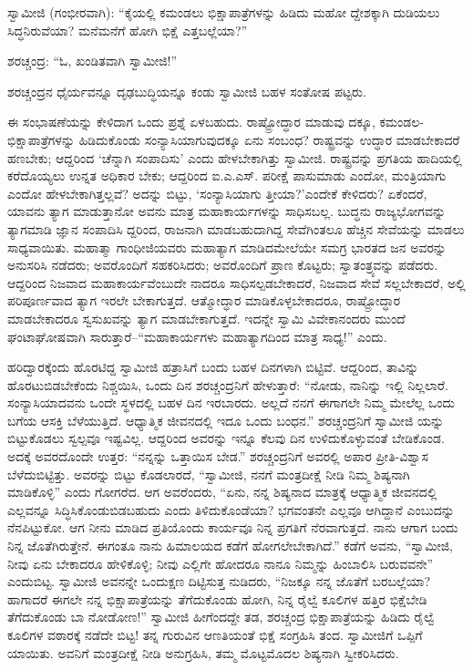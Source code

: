 ಸ್ವಾಮೀಜಿ (ಗಂಭೀರವಾಗಿ): “ಕೈಯಲ್ಲಿ ಕಮಂಡಲು ಭಿಕ್ಷಾಪಾತ್ರೆಗಳನ್ನು ಹಿಡಿದು ಮಹೋ ದ್ದೇಶಕ್ಕಾಗಿ ದುಡಿಯಲು ಸಿದ್ಧನಿರುವೆಯಾ? ಮನೆಮನೆಗೆ ಹೋಗಿ ಭಿಕ್ಷೆ ಎತ್ತಬಲ್ಲೆಯಾ?”

ಶರಚ್ಚಂದ್ರ: “ಓ, ಖಂಡಿತವಾಗಿ ಸ್ವಾಮೀಜಿ!”

ಶರಚ್ಚಂದ್ರನ ಧೈರ್ಯವನ್ನೂ ದೃಢಬುದ್ಧಿಯನ್ನೂ ಕಂಡು ಸ್ವಾಮೀಜಿ ಬಹಳ ಸಂತೋಷ ಪಟ್ಟರು.

ಈ ಸಂಭಾಷಣೆಯನ್ನು ಕೇಳಿದಾಗ ಒಂದು ಪ್ರಶ್ನೆ ಏಳಬಹುದು. ರಾಷ್ಟ್ರೋದ್ಧಾರ ಮಾಡುವು ದಕ್ಕೂ, ಕಮಂಡಲ-ಭಿಕ್ಷಾಪಾತ್ರೆಗಳನ್ನು ಹಿಡಿದುಕೊಂಡು ಸಂನ್ಯಾಸಿಯಾಗುವುದಕ್ಕೂ ಏನು ಸಂಬಂಧ? ರಾಷ್ಟ್ರವನ್ನು ಉದ್ಧಾರ ಮಾಡಬೇಕಾದರೆ ಹಣಬೇಕು; ಆದ್ದರಿಂದ ‘ಚೆನ್ನಾಗಿ ಸಂಪಾದಿಸು’ ಎಂದು ಹೇಳಬೇಕಾಗಿತ್ತು ಸ್ವಾಮೀಜಿ. ರಾಷ್ಟ್ರವನ್ನು ಪ್ರಗತಿಯ ಹಾದಿಯಲ್ಲಿ ಕರೆದೊಯ್ಯಲು ಉನ್ನತ ಅಧಿಕಾರ ಬೇಕು; ಆದ್ದರಿಂದ ಐ.ಎ.ಎಸ್. ಪರೀಕ್ಷೆ ಪಾಸುಮಾಡು ಎಂದೋ, ಮಂತ್ರಿಯಾಗು ಎಂದೋ ಹೇಳಬೇಕಾಗಿತ್ತಲ್ಲವೆ? ಅದನ್ನು ಬಿಟ್ಟು, ‘ಸಂನ್ಯಾಸಿಯಾಗು ತ್ತೀಯಾ?’ಎಂದೇಕೆ ಕೇಳಿದರು? ಏಕೆಂದರೆ, ಯಾವನು ತ್ಯಾಗ ಮಾಡುತ್ತಾನೋ ಅವನು ಮಾತ್ರ ಮಹಾಕಾರ್ಯಗಳನ್ನು ಸಾಧಿಸಬಲ್ಲ. ಬುದ್ಧನು ರಾಜ್ಯಭೋಗವನ್ನು ತ್ಯಾಗಮಾಡಿ ಜ್ಞಾನ ಸಂಪಾದಿಸಿ ದ್ದರಿಂದ, ರಾಜನಾಗಿ ಮಾಡಬಹುದಾಗಿದ್ದ ಸೇವೆಗಿಂತಲೂ ಹೆಚ್ಚಿನ ಸೇವೆಯನ್ನು ಮಾಡಲು ಸಾಧ್ಯವಾಯಿತು. ಮಹಾತ್ಮಾ ಗಾಂಧೀಜಿಯವರು ಮಹಾತ್ಯಾಗ ಮಾಡಿದಮೇಲೆಯೇ ಸಮಗ್ರ ಭಾರತದ ಜನ ಅವರನ್ನು ಅನುಸರಿಸಿ ನಡೆದರು; ಅವರೊಂದಿಗೆ ಸಹಕರಿಸಿದರು; ಅವರೊಂದಿಗೆ ಪ್ರಾಣ ಕೊಟ್ಟರು; ಸ್ವಾತಂತ್ರ್ಯವನ್ನು ಪಡೆದರು. ಆದ್ದರಿಂದ ನಿಜವಾದ ಮಹಾಕಾರ್ಯವೆಂಬುದೇ ನಾದರೂ ಸಾಧಿಸಲ್ಪಡಬೇಕಾದರೆ, ನಿಜವಾದ ಸೇವೆ ಸಲ್ಲಬೇಕಾದರೆ, ಅಲ್ಲಿ ಪರಿಪೂರ್ಣವಾದ ತ್ಯಾಗ ಇರಲೇ ಬೇಕಾಗುತ್ತದೆ. ಆತ್ಮೋದ್ಧಾರ ಮಾಡಿಕೊಳ್ಳಬೇಕಾದರೂ, ರಾಷ್ಟ್ರೋದ್ಧಾರ ಮಾಡಬೇಕಾದರೂ ಸ್ವಸುಖವನ್ನು ತ್ಯಾಗ ಮಾಡಬೇಕಾಗುತ್ತದೆ. ಇದನ್ನೇ ಸ್ವಾಮಿ ವಿವೇಕಾನಂದರು ಮುಂದೆ ಘಂಟಾಘೋಷವಾಗಿ ಸಾರುತ್ತಾರೆ–“ಮಹಾಕಾರ್ಯಗಳು ಮಹಾತ್ಯಾಗದಿಂದ ಮಾತ್ರ ಸಾಧ್ಯ!” ಎಂದು.

ಹರಿದ್ವಾರಕ್ಕೆಂದು ಹೊರಟಿದ್ದ ಸ್ವಾಮೀಜಿ ಹತ್ರಾಸಿಗೆ ಬಂದು ಬಹಳ ದಿನಗಳಾಗಿ ಬಿಟ್ಟಿವೆ. ಆದ್ದರಿಂದ, ತಾವಿನ್ನು ಹೊರಟುಬಿಡಬೇಕೆಂದು ನಿಶ್ಚಯಿಸಿ, ಒಂದು ದಿನ ಶರಚ್ಚಂದ್ರನಿಗೆ ಹೇಳುತ್ತಾರೆ: “ನೋಡು, ನಾನಿನ್ನು ಇಲ್ಲಿ ನಿಲ್ಲಲಾರೆ. ಸಂನ್ಯಾಸಿಯಾದವನು ಒಂದೇ ಸ್ಥಳದಲ್ಲಿ ಬಹಳ ದಿನ ಇರಬಾರದು. ಅಲ್ಲದೆ ನನಗೆ ಈಗಾಗಲೇ ನಿಮ್ಮ ಮೇಲೆಲ್ಲ ಒಂದು ಬಗೆಯ ಆಸಕ್ತಿ ಬೆಳೆಯುತ್ತಿದೆ. ಆಧ್ಯಾತ್ಮಿಕ ಜೀವನದಲ್ಲಿ ಇದೂ ಒಂದು ಬಂಧನ.” ಶರಚ್ಚಂದ್ರನಿಗೆ ಸ್ವಾಮೀಜಿ ಯನ್ನು ಬಿಟ್ಟುಕೊಡಲು ಸ್ವಲ್ಪವೂ ಇಷ್ಟವಿಲ್ಲ. ಆದ್ದರಿಂದ ಅವರನ್ನು ಇನ್ನೂ ಕೆಲವು ದಿನ ಉಳಿದುಕೊಳ್ಳುವಂತೆ ಬೇಡಿಕೊಂಡ. ಅದಕ್ಕೆ ಅವರದೊಂದೇ ಉತ್ತರ: “ನನ್ನನ್ನು ಒತ್ತಾಯಿಸ ಬೇಡ.” ಶರಚ್ಚಂದ್ರನಿಗೆ ಅವರಲ್ಲಿ ಅಪಾರ ಪ್ರೀತಿ-ವಿಶ್ವಾಸ ಬೆಳೆದುಬಿಟ್ಟಿತ್ತು. ಅವರನ್ನು ಬಿಟ್ಟು ಕೊಡಲಾರದೆ, “ಸ್ವಾಮೀಜಿ, ನನಗೆ ಮಂತ್ರದೀಕ್ಷೆ ನೀಡಿ ನಿಮ್ಮ ಶಿಷ್ಯನಾಗಿ ಮಾಡಿಕೊಳ್ಳಿ” ಎಂದು ಗೋಗರೆದ. ಆಗ ಅವರೆಂದರು, “ಏನು, ನನ್ನ ಶಿಷ್ಯನಾದ ಮಾತ್ರಕ್ಕೆ ಆಧ್ಯಾತ್ಮಿಕ ಜೀವನದಲ್ಲಿ ಎಲ್ಲವನ್ನೂ ಸಿದ್ಧಿಸಿಕೊಂಡುಬಿಡಬಹುದು ಎಂದು ತಿಳಿದುಕೊಂಡೆಯಾ? ಭಗವಂತನೇ ಎಲ್ಲವೂ ಆಗಿದ್ದಾನೆ ಎಂಬುದನ್ನು ನೆನಪಿಟ್ಟುಕೋ. ಆಗ ನೀನು ಮಾಡಿದ ಪ್ರತಿಯೊಂದು ಕಾರ್ಯವೂ ನಿನ್ನ ಪ್ರಗತಿಗೆ ನೆರವಾಗುತ್ತದೆ. ನಾನು ಆಗಾಗ ಬಂದು ನಿನ್ನ ಜೊತೆಗಿರುತ್ತೇನೆ. ಈಗಂತೂ ನಾನು ಹಿಮಾಲಯದ ಕಡೆಗೆ ಹೋಗಲೇಬೇಕಾಗಿದೆ.” ಕಡೆಗೆ ಅವನು, “ಸ್ವಾಮೀಜಿ, ನೀವು ಏನು ಬೇಕಾದರೂ ಹೇಳಿಕೊಳ್ಳಿ; ನೀವು ಎಲ್ಲಿಗೇ ಹೋದರೂ ನಾನೂ ನಿಮ್ಮನ್ನು ಹಿಂಬಾಲಿಸಿ ಬರುವವನೇ” ಎಂದುಬಿಟ್ಟ. ಸ್ವಾಮೀಜಿ ಅವನನ್ನೇ ಒಂದುಕ್ಷಣ ದಿಟ್ಟಿಸುತ್ತ ನುಡಿದರು, “ನಿಜಕ್ಕೂ ನನ್ನ ಜೊತೆಗೆ ಬರಬಲ್ಲೆಯಾ? ಹಾಗಾದರೆ ಈಗಲೇ ನನ್ನ ಭಿಕ್ಷಾಪಾತ್ರೆಯನ್ನು ತೆಗೆದುಕೊಂಡು ಹೋಗಿ, ನಿನ್ನ ರೈಲ್ವೆ ಕೂಲಿಗಳ ಹತ್ತಿರ ಭಿಕ್ಷೆಬೇಡಿ ತೆಗೆದುಕೊಂಡು ಬಾ ನೋಡೋಣ!” ಸ್ವಾಮೀಜಿ ಹೀಗೆಂದದ್ದೇ ತಡ, ಶರಚ್ಚಂದ್ರ ಭಿಕ್ಷಾಪಾತ್ರೆಯನ್ನು ಹಿಡಿದು ರೈಲ್ವೆ ಕೂಲಿಗಳ ವಠಾರಕ್ಕೆ ನಡೆದೇ ಬಿಟ್ಟ! ತನ್ನ ಗುರುವಿನ ಆಣತಿಯಂತೆ ಭಿಕ್ಷೆ ಸಂಗ್ರಹಿಸಿ ತಂದ. ಸ್ವಾಮೀಜಿಗೆ ಒಪ್ಪಿಗೆ ಯಾಯಿತು. ಅವನಿಗೆ ಮಂತ್ರದೀಕ್ಷೆ ನೀಡಿ ಅನುಗ್ರಹಿಸಿ, ತಮ್ಮ ಮೊಟ್ಟಮೊದಲ ಶಿಷ್ಯನಾಗಿ ಸ್ವೀಕರಿಸಿದರು.

